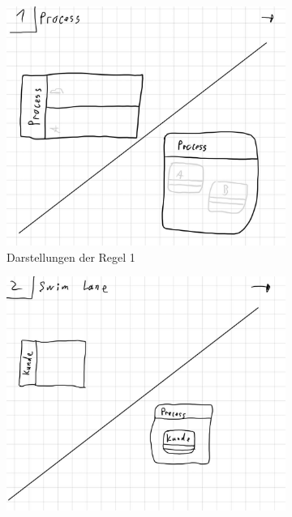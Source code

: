 \begin{figure}
    \centering
    \begin{subfigure}{0.4\textwidth}
        \centering
        \includegraphics[width=\textwidth,keepaspectratio]{../images/rule/rule1.jpg}%
        \caption{Darstellungen der Regel 1}%
        \label{fig:ruleExample1}
    \end{subfigure}
    \hfill
    \begin{subfigure}{0.4\textwidth}
        \centering
        \includegraphics[width=\textwidth,keepaspectratio]{../images/rule/rule2.jpg}%

\end{subfigure}
\end{figure}
